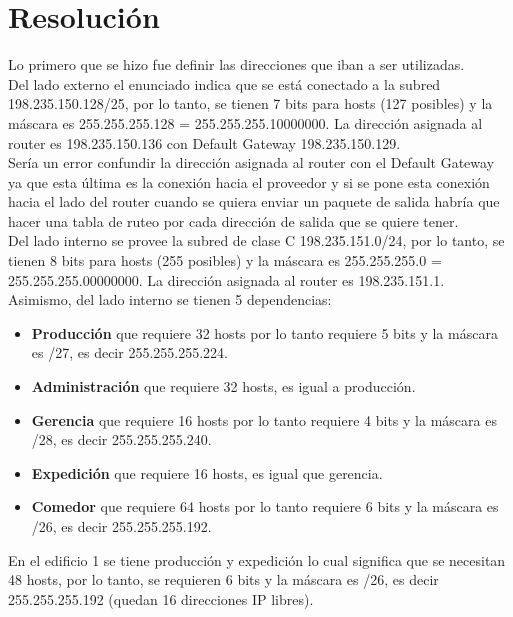 \section{Resolución}

Lo primero que se hizo fue definir las direcciones que iban a ser utilizadas.\\

Del lado externo el enunciado indica que se está conectado a la subred 198.235.150.128/25, por lo tanto, se tienen 7 bits para hosts (127 posibles) y la máscara es 255.255.255.128 = 255.255.255.10000000. La dirección asignada al router es 198.235.150.136 con Default Gateway 198.235.150.129.\\

Sería un error confundir la dirección asignada al router con el Default Gateway ya que esta última es la conexión hacia el proveedor y si se pone esta conexión hacia el lado del router cuando se quiera enviar un paquete de salida habría que hacer una tabla de ruteo por cada dirección de salida que se quiere tener.\\

Del lado interno se provee la subred de clase C 198.235.151.0/24, por lo tanto, se tienen 8 bits para hosts (255 posibles) y la máscara es 255.255.255.0 = 255.255.255.00000000. La dirección asignada al router es 198.235.151.1.\\

Asimismo, del lado interno se tienen 5 dependencias:
\begin{itemize}
    \item \textbf{Producción} que requiere 32 hosts por lo tanto requiere 5 bits y la máscara es /27, es decir 255.255.255.224.
    \item \textbf{Administración} que requiere 32 hosts, es igual a producción.
    \item \textbf{Gerencia} que requiere 16 hosts por lo tanto requiere 4 bits y la máscara es /28, es decir 255.255.255.240.
    \item \textbf{Expedición} que requiere 16 hosts, es igual que gerencia.
    \item \textbf{Comedor} que requiere 64 hosts por lo tanto requiere 6 bits y la máscara es /26, es decir 255.255.255.192.
\end{itemize}

En el edificio 1 se tiene producción y expedición lo cual significa que se necesitan 48 hosts, por lo tanto, se requieren 6 bits y la máscara es /26, es decir 255.255.255.192 (quedan 16 direcciones IP libres).\\

